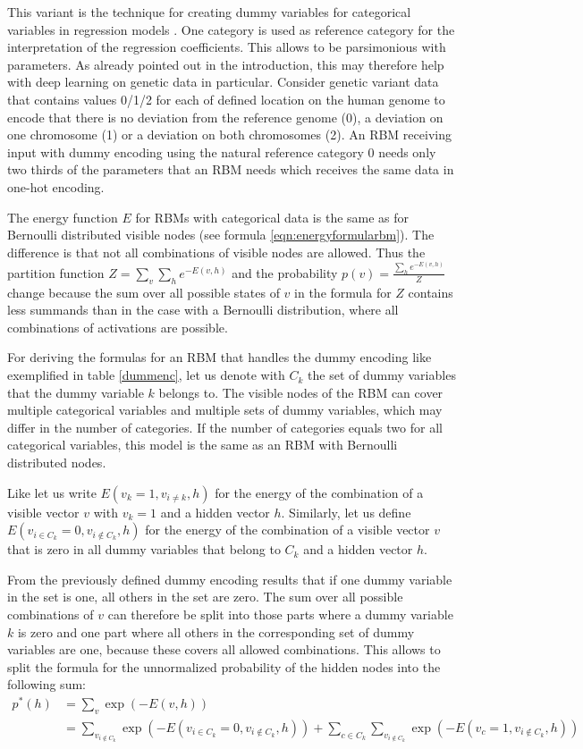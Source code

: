 \documentclass[12pt]{article}
\begin{document}
This variant is the technique for creating dummy variables for categorical variables in regression models \citep{faraway_regression}.
One category is used as reference category for the interpretation of the regression coefficients.
This allows to be parsimonious with parameters.
As already pointed out in the introduction, this may therefore help with deep learning on genetic data in particular.
Consider genetic variant data that contains values 0/1/2 for each of defined location on the human genome to encode that there is no deviation from the reference genome (0), a deviation on one chromosome (1) or a deviation on both chromosomes (2).
An RBM receiving input with dummy encoding using the natural reference category 0 needs only two thirds of the parameters that an RBM needs which receives the same data in one-hot encoding.

The energy function $E$ for RBMs with categorical data is the same as for Bernoulli distributed visible nodes (see formula \ref{eqn:energyformularbm}).
The difference is that not all combinations of visible nodes are allowed. Thus the partition function $Z = \sum_{v} \sum_{h} e^{-E(v,h)}$ and the probability
$p(v) = \frac{\sum_h e^{-E(v,h)}}{Z}$ change because the sum over all possible states of $v$ in the formula for $Z$ contains less summands than in the case with a Bernoulli distribution, where all combinations of activations are possible.

For deriving the formulas for an RBM that handles the dummy encoding like exemplified in table \ref{dummenc}, let us denote with $C_k$ the set of dummy variables that the dummy variable $k$ belongs to.
The visible nodes of the RBM can cover multiple categorical variables and multiple sets of dummy variables, which may differ in the number of categories.
If the number of categories equals two for all categorical variables, this model is the same as an RBM with Bernoulli distributed nodes.

Like \cite{krizhevsky2009tinyimagesthesis} let us write $E(v_k = 1, v_{i \neq k}, h)$ for the energy of the combination of a visible vector $v$ with $v_k = 1$ and a hidden vector $h$. Similarly, let us define $E(v_{i \in C_k} = 0, v_{i \notin C_k}, h)$ for the energy of the combination of a visible vector $v$ that is zero in all dummy variables that belong to $C_k$ and a hidden vector $h$.

From the previously defined dummy encoding results that if one dummy variable in the set is one, all others in the set are zero. 
The sum over all possible combinations of $v$ can therefore be split into those parts where a dummy variable $k$ is zero and one part where all others in the corresponding set of dummy variables are one, because these covers all allowed combinations.
This allows to split the formula for the unnormalized probability of the hidden nodes into the following sum:
\begin{align}
p^*(h) &= \sum_v  \exp (-E(v,h)) \nonumber \\
&= \sum_{v_{i \notin C_k}} \exp (-E(v_{i \in C_k} = 0, v_{i \notin C_k}, h)) + \sum_{c \in C_k} \sum_{v_{i \notin C_k}} \exp ( - E(v_c = 1, v_{i \notin C_k},  h))
\end{align}
\end{document}
